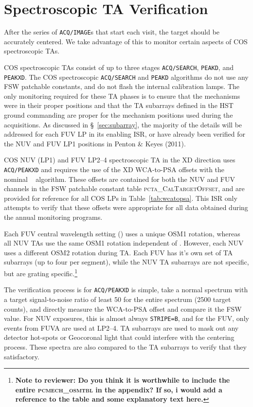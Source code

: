 \section{Spectroscopic TA Verification}\label{sec:spVER}

After the series of \texttt{ACQ/IMAGE}s that start each visit, the target should be accurately centered.
We take advantage of this to monitor certain aspects of COS spectroscopic TAs.

COS spectroscopic TAs consist of up to three stages \texttt{ACQ/SEARCH}, \texttt{PEAKD}, and \texttt{PEAKXD}.
The COS spectroscopic \texttt{ACQ/SEARCH} and \texttt{PEAKD} algorithms do not use any FSW patchable constants, and do not flash the
internal calibration lamps. The only monitoring required for these TA phases is to ensure that the mechanisms were in their proper
positions and that the TA subarrays defined in the HST ground commanding are proper for the mechanism positions used during the acquisitions.
As discussed in \S~\ref{sec:subarray}, the majority of the details will be addressed for each FUV LP in its enabling ISR, or have already been verified
for the NUV and FUV LP1 positions in Penton \& Keyes (2011).

COS NUV (LP1) and FUV LP2--4 spectroscopic TA in the XD direction uses \texttt{ACQ/PEAKXD} and requires the use of the XD WCA-to-PSA offsets with the nominal \numposone~ algorithm.
These offsets are contained for both the NUV and FUV channels in the FSW patchable constant table \textsc{pcta\_CalTargetOffset}, and are provided for reference for all COS LPs in Table~\ref{tab:wcatopsa}.
This ISR only attempts to verify that these offsets were appropriate for all data obtained during the annual monitoring programs.

Each FUV central wavelength setting (\cenwave) uses a unique OSM1 rotation, whereas all NUV TAs use the same OSM1 rotation independent of \cenwave.
However, each NUV \cenwave uses a different OSM2 rotation during TA. Each FUV \cenwave has it's own set of TA subarrays (up to four per segment), while the NUV TA subarrays are not \cenwave
specific, but are grating specific.\footnote{{\bf Note to reviewer: Do you think it is worthwhile to include the entire \textsc{pcmech\_osmtbl} in the appendix? If so, i would add a reference to the table and some
explanatory text here.}}

The verification process is for \texttt{ACQ/PEAKXD} is simple, take a normal spectrum with a target signal-to-noise ratio of least 50 for the entire spectrum (2500 target counts),
and directly measure the WCA-to-PSA offset and compare it the FSW value. For NUV exposures, this is almost always \texttt{STRIPE=B}, and for the FUV, only events from FUVA are used at LP2--4.
TA subarrays are used to mask out any detector hot-spots or Geocoronal light that could interfere with the centering process. These spectra are also compared to the TA subarrays to
verify that they satisfactory.


